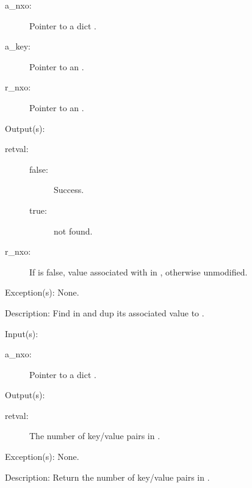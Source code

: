 \begin{capi}
\begin{capilist}
\begin{description}
		\item[a\_nxo: ]
			Pointer to a dict .
		\item[a\_key: ]
			Pointer to an .
		\item[r\_nxo: ]
			Pointer to an .
		\end{description}
	\item[Output(s): ]
		\begin{description}\item[]
		\item[retval: ]
			\begin{description}\item[]
			\item[false: ]
				Success.
			\item[true: ]
				 not found.
			\end{description}
		\item[r\_nxo: ]
			If  is false, value associated with
			 in , otherwise unmodified.
		\end{description}
	\item[Exception(s): ] None.
	\item[Description: ]
		Find  in  and dup its associated value
		to .
	\end{capilist}
\label{nxo_dict_count}
	\begin{capilist}
	\item[Input(s): ]
		\begin{description}\item[]
		\item[a\_nxo: ]
			Pointer to a dict .
		\end{description}
	\item[Output(s): ]
		\begin{description}\item[]
		\item[retval: ]
			The number of key/value pairs in .
		\end{description}
	\item[Exception(s): ] None.
	\item[Description: ]
		Return the number of key/value pairs in .
	\end{capilist}
\label{nxo_dict_iterate}

\end{capi}
